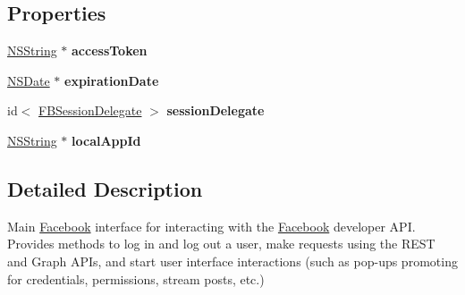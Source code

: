 \subsection*{\-Properties}
\begin{DoxyCompactItemize}
\item 
\hypertarget{interface_facebook_ae445488bf8cda36a5aa66b2ec519dfa6}{
\hyperlink{class_n_s_string}{\-N\-S\-String} $\ast$ {\bfseries access\-Token}}
\label{interface_facebook_ae445488bf8cda36a5aa66b2ec519dfa6}

\item 
\hypertarget{interface_facebook_af652da0c9eabf1c9731bcee3b1894798}{
\hyperlink{class_n_s_date}{\-N\-S\-Date} $\ast$ {\bfseries expiration\-Date}}
\label{interface_facebook_af652da0c9eabf1c9731bcee3b1894798}

\item 
\hypertarget{interface_facebook_aed1c9f5f848e6e9311f70b8f7b90f725}{
id$<$ \hyperlink{protocol_f_b_session_delegate-p}{\-F\-B\-Session\-Delegate} $>$ {\bfseries session\-Delegate}}
\label{interface_facebook_aed1c9f5f848e6e9311f70b8f7b90f725}

\item 
\hypertarget{interface_facebook_a92656629194a382e33355323ebc4e8ba}{
\hyperlink{class_n_s_string}{\-N\-S\-String} $\ast$ {\bfseries local\-App\-Id}}
\label{interface_facebook_a92656629194a382e33355323ebc4e8ba}

\end{DoxyCompactItemize}


\subsection{\-Detailed \-Description}
\-Main \hyperlink{interface_facebook}{\-Facebook} interface for interacting with the \hyperlink{interface_facebook}{\-Facebook} developer \-A\-P\-I. \-Provides methods to log in and log out a user, make requests using the \-R\-E\-S\-T and \-Graph \-A\-P\-Is, and start user interface interactions (such as pop-\/ups promoting for credentials, permissions, stream posts, etc.) 

